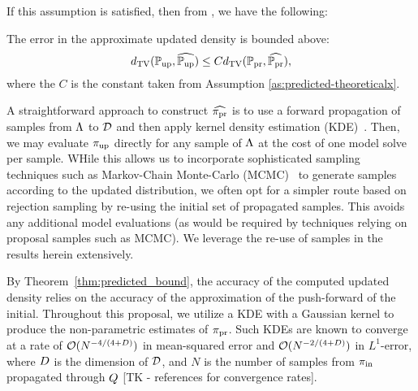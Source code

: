 If this assumption is satisfied, then from \cite{BJW18}, we have the following:
\begin{thm}\label{thm:predicted_bound}
  The error in the approximate updated density is bounded above:
  \begin{equation}\label{eq:predicted_bound}
    d_{\text{TV}} (\operatorname*{\mathbb{P}_{up}}, \widehat{\operatorname*{\mathbb{P}_{up}}}) \leq C d_{\text{TV}} (\operatorname*{\mathbb{P}_{pr}}, \widehat{\operatorname*{\mathbb{P}_{pr}}}),
  \end{equation}
  where the $C$ is the constant taken from Assumption \ref{as:predicted-theoreticalx}.
\end{thm}

A straightforward approach to construct $\widehat{\operatorname*{\pi_{pr}}}$ is to use a forward propagation of samples from ${\Lambda}$ to $\mathcal{D}$ and then apply kernel density estimation (KDE)~\cite{BJW18}.
Then, we may evaluate $\operatorname*{\pi_{up}}$ directly for any sample of ${\Lambda}$ at the cost of one model solve per sample.
WHile this allows us to incorporate sophisticated sampling techniques such as Markov-Chain Monte-Carlo (MCMC)~\cite{Smith, Tarantola_book} to generate samples according to the updated distribution, we often opt for a simpler route based on rejection sampling by re-using the initial set of propagated samples.
This avoids any additional model evaluations (as would be required by techniques relying on proposal samples such as MCMC).
We leverage the re-use of samples in the results herein extensively.

By Theorem~\ref{thm:predicted_bound}, the accuracy of the computed updated density relies on the accuracy of the approximation of the push-forward of the initial.
Throughout this proposal, we utilize a KDE with a Gaussian kernel to produce the non-parametric estimates of $\operatorname*{\pi_{pr}}$.
Such KDEs are known to converge at a rate of $\mathcal{O}(N^{-4/(4+D)})$ in mean-squared error and $\mathcal{O}(N^{-2/(4+D)})$ in $L^1$-error, where $D$ is the dimension of $\mathcal{D}$, and $N$ is the number of samples from $\operatorname*{\pi_{in}}$ propagated through $Q$ [TK - references for convergence rates].

